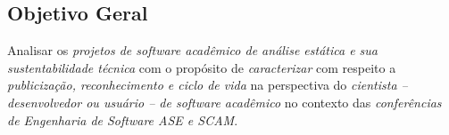 %

\subsection{Objetivo Geral}

Analisar os \textit{projetos de software acadêmico de análise estática e sua sustentabilidade técnica} %
com o propósito de \textit{caracterizar} %
com respeito a \textit{publicização, reconhecimento e ciclo de vida} %
na perspectiva do \textit{cientista -- desenvolvedor ou usuário -- de software acadêmico} %
no contexto das \textit{conferências de Engenharia de Software ASE e SCAM}. %

